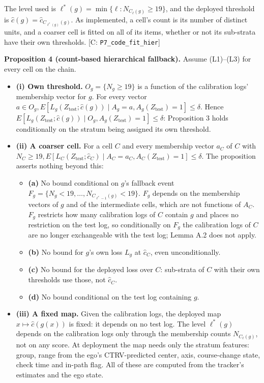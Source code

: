\documentclass{ieeeaccess}
\begin{document}
The level used is $\ell^{*}(g) = \min\{\ell : N_{C_{\ell}(g)} \geq 19\}$, and the deployed threshold is $\hat{c}(g) = \hat{c}_{C_{\ell^{*}(g)}(g)}$. As implemented, a cell's count is its number of distinct units, and a coarser cell is fitted on all of its items, whether or not its sub-strata have their own thresholds. [C: \texttt{P7\_code\_fit\_hier}]

\textbf{Proposition 4 (count-based hierarchical fallback).} Assume (L1)--(L3) for every cell on the chain.

\begin{itemize}
\item \textbf{(i) Own threshold.} $O_{g} = \{N_{g} \geq 19\}$ is a function of the calibration logs' membership vector for $g$. For every vector $a \in O_{g}, E[L_{g}(Z_{\mathrm{test}}; \hat{c}(g)) \mid A_{g} = a, A_{g}(Z_{\mathrm{test}}) = 1] \leq \delta$. Hence $E[L_{g}(Z_{\mathrm{test}}; \hat{c}(g)) \mid O_{g}, A_{g}(Z_{\mathrm{test}}) = 1] \leq \delta$: Proposition 3 holds conditionally on the stratum being assigned its own threshold.
\item \textbf{(ii) A coarser cell.} For a cell $C$ and every membership vector $a_{C}$ of $C$ with $N_{C} \geq 19, E[L_{C}(Z_{\mathrm{test}}; \hat{c}_{C}) \mid A_{C} = a_{C}, A_{C}(Z_{\mathrm{test}}) = 1] \leq \delta$. The proposition asserts nothing beyond this:
\begin{itemize}
\item \textbf{(a)} No bound conditional on $g$'s fallback event $F_{g} = \{N_{g} < 19, \dots, N_{C_{\ell^{*}-1}(g)} < 19\}$. $F_{g}$ depends on the membership vectors of $g$ and of the intermediate cells, which are not functions of $A_{C}$. $F_{g}$ restricts how many calibration logs of $C$ contain $g$ and places no restriction on the test log, so conditionally on $F_{g}$ the calibration logs of $C$ are no longer exchangeable with the test log; Lemma A.2 does not apply.
\item \textbf{(b)} No bound for $g$'s own loss $L_{g}$ at $\hat{c}_{C}$, even unconditionally.
\item \textbf{(c)} No bound for the deployed loss over $C$: sub-strata of $C$ with their own thresholds use those, not $\hat{c}_{C}$.
\item \textbf{(d)} No bound conditional on the test log containing $g$.
\end{itemize}
\item \textbf{(iii) A fixed map.} Given the calibration logs, the deployed map $x \mapsto \hat{c}(g(x))$ is fixed: it depends on no test log. The level $\ell^{*}(g)$ depends on the calibration logs only through the membership counts $N_{C_{\ell}(g)}$, not on any score. At deployment the map needs only the stratum features: group, range from the ego's CTRV-predicted center, axis, course-change state, check time and in-path flag. All of these are computed from the tracker's estimates and the ego state.
\end{itemize}
\end{document}
